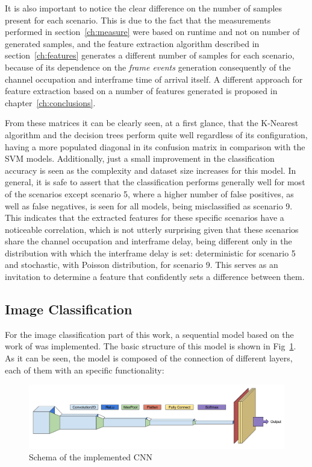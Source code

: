 It is also important to notice the clear difference on the number of samples present for each scenario. This is due to the fact that the measurements performed in section~\ref{ch:measure} were based on runtime and not on number of generated samples, and the feature extraction algorithm described in section~\ref{ch:features} generates a different number of samples for each scenario, because of its dependence on the \emph{frame events} generation consequently of the channel occupation and interframe time of arrival itself. A different approach for feature extraction based on a number of features generated is proposed in chapter~\ref{ch:conclusions}.

From these matrices it can be clearly seen, at a first glance, that the K-Nearest algorithm and the decision trees perform quite well regardless of its configuration, having a more populated diagonal in its confusion matrix in comparison with the \ac{SVM} models. Additionally, just a small improvement in the classification accuracy is seen as the complexity and dataset size increases for this model. In general, it is safe to assert that the classification performs generally well for most of the scenarios except scenario 5, where a higher number of false positives, as well as false negatives, is seen for all models, being misclassified as scenario 9. This indicates that the extracted features for these specific scenarios have a noticeable correlation, which is not utterly surprising given that these scenarios share the channel occupation and interframe delay, being different only in the distribution with which the interframe delay is set: deterministic for scenario 5 and stochastic, with Poisson distribution, for scenario 9. This serves as an invitation to determine a feature that confidently sets a difference between them.
\subsection{Image Classification}\label{ch:image_classification}
For the image classification part of this work, a sequential model based on the work of \cite{Paisana2017} was implemented. The basic structure of this model is shown in Fig~\ref{fig:cnn}. As it can be seen, the model is composed of the connection of different layers, each of them with an specific functionality:

\begin{figure}[!htb]
    \centering
      \includegraphics[width=\textwidth]{figures/cnn}
      \caption{Schema of the implemented CNN}
      \label{fig:cnn}
\end{figure}


